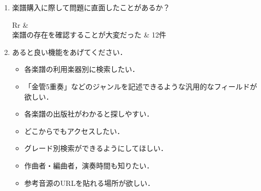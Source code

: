 \begin{oframed}
\begin{enumerate}
        \item 楽譜購入に際して問題に直面したことがあるか？\vspace{.3cm}\\
              \begin{tabularx}{\linewidth}{Rr}
                   &  \\
                  \hline
                  楽譜の存在を確認することが{{大変}}だった              & 12件                                \\
                  \hline
              \end{tabularx}
        \item あると良い機能をあげてください．
              \begin{itemize}
                  \item 各楽譜の利用楽器別に検索したい．
                  \item 「金管5重奏」などのジャンルを記述できるような汎用的なフィールドが欲しい．
                  \item 各楽譜の出版社がわかると探しやすい．
                  \item どこからでもアクセスしたい．
                  \item グレード別検索ができるようにしてほしい．
                  \item 作曲者・編曲者，演奏時間も知りたい．
                  \item 参考音源のURLを貼れる場所が欲しい．
              \end{itemize}
    \end{enumerate}
\end{oframed}